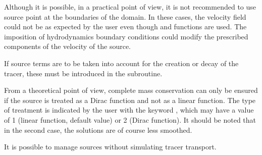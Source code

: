 Although it is possible, in a practical point of view, it is not recommended
to use source point at the boundaries of the domain. In these cases, the
velocity field could not be as expected by the user even though 
and  functions are used. The imposition of hydrodynamics
boundary conditions could modify the prescribed components of the velocity of
the source.

If source terms are to be taken into account for the creation or decay of the
tracer, these must be introduced in the  subroutine.

From a theoretical point of view, complete mass conservation can only be
ensured if the source is treated as a Dirac function and not as a linear
function. The type of treatment is indicated by the user with the keyword
, which may have a value of 1 (linear function, default
value) or 2 (Dirac function). It should be noted that in the second case, the
solutions are of course less smoothed.

It is possible to manage sources without simulating tracer transport.


